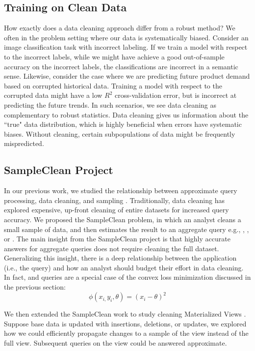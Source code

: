 \subsection{Training on Clean Data}
How exactly does a data cleaning approach differ from a robust method?
We often in the problem setting where our data is systematically biased.
Consider an image classification task with incorrect labeling.
If we train a model with respect to the incorrect labels, while we might have achieve a good out-of-sample accuracy on the incorrect labels, the classifications are incorrect in a semantic sense.
Likewise, consider the case where we are predicting future product demand based on corrupted historical data.
Training a model with respect to the corrupted data might have a low $R^2$ cross-validation error, but is incorrect
at predicting the future trends.
In such scenarios, we see data cleaning as complementary to robust statistics.
Data cleaning gives us information about the ``true" data distribution, which is highly beneficial when errors have systematic biases.
Without cleaning, certain subpopulations of data might be frequently mispredicted. 

\subsection{SampleClean Project}
In our previous work, we studied the relationship between approximate query processing, data cleaning, and sampling \cite{wang1999sample, technicalReport}.
Traditionally, data cleaning has explored expensive, up-front cleaning of entire datasets for increased query accuracy.
We proposed the SampleClean problem, in which an analyst cleans a small sample of data, and then estimates the result to an aggregate query e.g., \sumfunc, \countfunc, or \avgfunc.
The main insight from the SampleClean project is that highly accurate answers for aggregate queries does not require cleaning the full dataset.
Generalizing this insight, there is a deep relationship between the application (i.e., the query) and how an analyst should budget their effort in data cleaning.
In fact, \avgfunc and \sumfunc queries are a special case of the convex loss minimization discussed in the previous section:
\[
\phi(x_{i,}y_{i},\theta) = (x_{i} - \theta)^2
\]

We then extended the SampleClean work to study cleaning Materialized Views \cite{technicalReport}.
Suppose base data is updated with insertions, deletions, or updates, we explored how we could efficiently propagate
changes to a sample of the view instead of the full view.
Subsequent queries on the view could be answered approximate.

